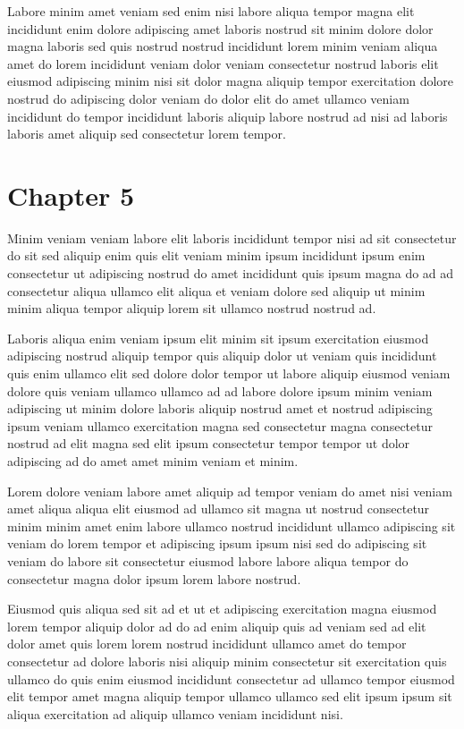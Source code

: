 \documentclass{book}
\begin{document}
Labore minim amet veniam sed enim nisi labore aliqua tempor magna elit incididunt enim dolore adipiscing amet laboris nostrud sit minim dolore dolor magna laboris sed quis nostrud nostrud incididunt lorem minim veniam aliqua amet do lorem incididunt veniam dolor veniam consectetur nostrud laboris elit eiusmod adipiscing minim nisi sit dolor magna aliquip tempor exercitation dolore nostrud do adipiscing dolor veniam do dolor elit do amet ullamco veniam incididunt do tempor incididunt laboris aliquip labore nostrud ad nisi ad laboris laboris amet aliquip sed consectetur lorem tempor.

\chapter{Chapter 5}

Minim veniam veniam labore elit laboris incididunt tempor nisi ad sit consectetur do sit sed aliquip enim quis elit veniam minim ipsum incididunt ipsum enim consectetur ut adipiscing nostrud do amet incididunt quis ipsum magna do ad ad consectetur aliqua ullamco elit aliqua et veniam dolore sed aliquip ut minim minim aliqua tempor aliquip lorem sit ullamco nostrud nostrud ad.

Laboris aliqua enim veniam ipsum elit minim sit ipsum exercitation eiusmod adipiscing nostrud aliquip tempor quis aliquip dolor ut veniam quis incididunt quis enim ullamco elit sed dolore dolor tempor ut labore aliquip eiusmod veniam dolore quis veniam ullamco ullamco ad ad labore dolore ipsum minim veniam adipiscing ut minim dolore laboris aliquip nostrud amet et nostrud adipiscing ipsum veniam ullamco exercitation magna sed consectetur magna consectetur nostrud ad elit magna sed elit ipsum consectetur tempor tempor ut dolor adipiscing ad do amet amet minim veniam et minim.

Lorem dolore veniam labore amet aliquip ad tempor veniam do amet nisi veniam amet aliqua aliqua elit eiusmod ad ullamco sit magna ut nostrud consectetur minim minim amet enim labore ullamco nostrud incididunt ullamco adipiscing sit veniam do lorem tempor et adipiscing ipsum ipsum nisi sed do adipiscing sit veniam do labore sit consectetur eiusmod labore labore aliqua tempor do consectetur magna dolor ipsum lorem labore nostrud.

Eiusmod quis aliqua sed sit ad et ut et adipiscing exercitation magna eiusmod lorem tempor aliquip dolor ad do ad enim aliquip quis ad veniam sed ad elit dolor amet quis lorem lorem nostrud incididunt ullamco amet do tempor consectetur ad dolore laboris nisi aliquip minim consectetur sit exercitation quis ullamco do quis enim eiusmod incididunt consectetur ad ullamco tempor eiusmod elit tempor amet magna aliquip tempor ullamco ullamco sed elit ipsum ipsum sit aliqua exercitation ad aliquip ullamco veniam incididunt nisi.
\end{document}
